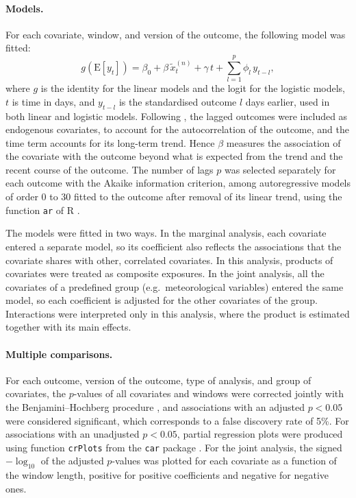 \documentclass[11pt,a4paper]{article}
\begin{document}
\paragraph{Models.}
For each covariate, window, and version of the outcome, the following model was
fitted:
\begin{equation}
  g\left(\mathrm{E}[y_t]\right) = \beta_0 + \beta\, \tilde{x}^{(n)}_t + \gamma\, t
  + \sum_{l=1}^{p} \phi_l\, y_{t-l},
\end{equation}
where $g$ is the identity for the linear models and the logit for the logistic
models, $t$ is time in days, and $y_{t-l}$ is the standardised outcome $l$ days
earlier, used in both linear and logistic models. Following \citet{mcdonald2020}, the
lagged outcomes were included as endogenous covariates, to account for the
autocorrelation of the outcome, and the time term accounts for its long-term trend.
Hence $\beta$ measures the association of the covariate with the outcome beyond what
is expected from the trend and the recent course of the outcome. The number of lags 
$p$ was selected separately for each outcome with the Akaike information criterion, 
among autoregressive models of order 0 to 30 fitted to the outcome after removal 
of its linear trend, using the function \texttt{ar} of R \citep{Rcore}.

The models were fitted in two ways. In the marginal analysis, each covariate entered
a separate model, so its coefficient also reflects the associations that the
covariate shares with other, correlated covariates. In this analysis, products of
covariates were treated as composite exposures. In the joint analysis, all the
covariates of a predefined group (e.g.\ meteorological variables) entered the same
model, so each coefficient is adjusted for the other covariates of the group.
Interactions were interpreted only in this analysis, where the product is estimated
together with its main effects.

\paragraph{Multiple comparisons.}
For each outcome, version of the outcome, type of analysis, and group of covariates,
the $p$-values of all covariates and windows were corrected jointly with the
Benjamini--Hochberg procedure \citep{benjamini1995}, and associations with an adjusted
$p < 0.05$ were considered significant, which corresponds to a false discovery rate of
5\%. For associations with an unadjusted $p < 0.05$, partial regression plots
were produced using function \texttt{crPlots} from the \texttt{car} package \citep{car}. 
For the joint analysis, the signed $-\log_{10}$ of the adjusted $p$-values was plotted 
for each covariate as a function of the window length, positive for positive coefficients and negative for negative ones.
\end{document}
